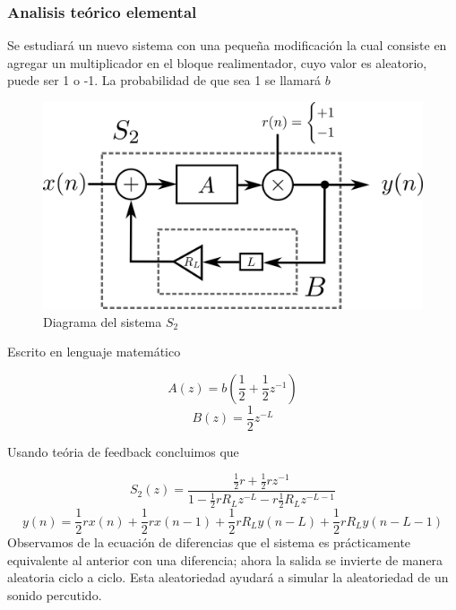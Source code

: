 \documentclass[assd_tp2_main.tex]{subfiles}
\begin{document}
\subsubsection{Analisis teórico elemental}
Se estudiará un nuevo sistema con una pequeña modificación la cual consiste en agregar un multiplicador en el bloque realimentador, cuyo valor es aleatorio, puede ser 1 o -1. La probabilidad de que sea 1 se llamará $b$ 
\begin{figure}[H]
	\begin{center}
	\includegraphics[scale=1]{graficos/bloque3ej5.png}
	\caption{Diagrama del sistema $S_2$}

	\end{center}
\end{figure}

Escrito en lenguaje matemático

\begin{equation}
	A(z)=b(\frac{1}{2}+\frac{1}{2}z^{-1})
\end{equation}
\begin{equation}
	B(z)=\frac{1}{2}z^{-L}
\end{equation}

Usando teória de feedback concluimos que

\begin{equation}
	S_2(z)=\frac{\frac{1}{2}r+\frac{1}{2}rz^{-1}}{1-\frac{1}{2}rR_Lz^{-L}-r\frac{1}{2}R_Lz^{-L-1}}
\end{equation}
\begin{equation}
	y(n) = \frac{1}{2}rx(n) + \frac{1}{2}rx(n-1) + \frac{1}{2}rR_Ly(n-L)+\frac{1}{2}rR_Ly(n-L-1)
\end{equation}
Observamos de la ecuación de diferencias que el sistema es prácticamente equivalente al anterior con una diferencia; ahora la salida se invierte de manera aleatoria ciclo a ciclo. Esta aleatoriedad ayudará a simular la aleatoriedad de un sonido percutido.
\end{document}
